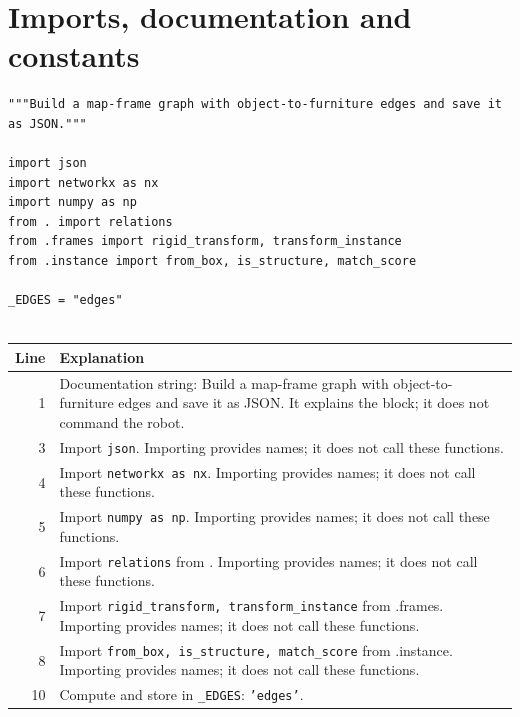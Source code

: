 \documentclass[11pt,a4paper]{book}
\begin{document}
\section{Imports, documentation and constants}

\begin{lstlisting}[firstnumber=1]
"""Build a map-frame graph with object-to-furniture edges and save it as JSON."""

import json
import networkx as nx
import numpy as np
from . import relations
from .frames import rigid_transform, transform_instance
from .instance import from_box, is_structure, match_score

_EDGES = "edges"


\end{lstlisting}

\begin{longtable}{r p{}}

\textbf{Line} & \textbf{Explanation} \\ \hline \endhead

1 & Documentation string: Build a map-frame graph with object-to-furniture edges and save it as JSON. It explains the block; it does not command the robot. \\

3 & Import \texttt{json}. Importing provides names; it does not call these functions. \\

4 & Import \texttt{networkx as nx}. Importing provides names; it does not call these functions. \\

5 & Import \texttt{numpy as np}. Importing provides names; it does not call these functions. \\

6 & Import \texttt{relations} from . Importing provides names; it does not call these functions. \\

7 & Import \texttt{rigid\_transform, transform\_instance} from .frames. Importing provides names; it does not call these functions. \\

8 & Import \texttt{from\_box, is\_structure, match\_score} from .instance. Importing provides names; it does not call these functions. \\

10 & Compute and store in \texttt{\_EDGES}: \texttt{'edges'}.  \\

\end{longtable}
\end{document}
